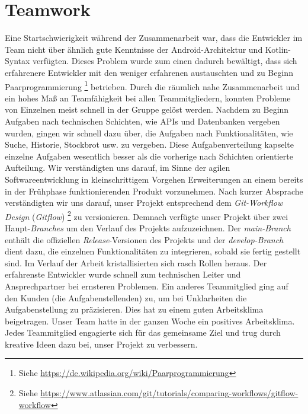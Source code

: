 \documentclass[a4paper]{article}
\begin{document}
\section{Teamwork}
\label{sec:teamwork}
Eine Startschwierigkeit während der Zusammenarbeit war, dass die Entwickler im Team nicht über ähnlich gute Kenntnisse der Android-Architektur und Kotlin-Syntax verfügten.
Dieses Problem wurde zum einen dadurch bewältigt, dass sich erfahrenere Entwickler mit den weniger erfahrenen austauschten und zu Beginn Paarprogrammierung \footnote{Siehe \url{https://de.wikipedia.org/wiki/Paarprogrammierung}} betrieben.
Durch die räumlich nahe Zusammenarbeit und ein hohes Maß an Teamfähigkeit bei allen Teammitgliedern, konnten Probleme von Einzelnen meist schnell in der Gruppe gelöst werden.
Nachdem zu Beginn Aufgaben nach technischen Schichten, wie APIs und Datenbanken vergeben wurden, gingen wir schnell dazu über, die Aufgaben nach Funktionalitäten, wie Suche, Historie, Stockbrot usw. zu vergeben.
Diese Aufgabenverteilung kapselte einzelne Aufgaben wesentlich besser als die vorherige nach Schichten orientierte Aufteilung.
Wir verständigten uns darauf, im Sinne der agilen Softwareentwicklung in kleinschrittigem Vorgehen Erweiterungen an einem bereits in der Frühphase funktionierenden Produkt vorzunehmen.
Nach kurzer Absprache verständigten wir uns darauf, unser Projekt entsprechend dem \textit{Git-Workflow Design} (\textit{Gitflow}) \footnote{Siehe \url{https://www.atlassian.com/git/tutorials/comparing-workflows/gitflow-workflow}} zu versionieren.
Demnach verfügte unser Projekt über zwei Haupt-\textit{Branches} um den Verlauf des Projekts aufzuzeichnen.
Der \textit{main-Branch} enthält die offiziellen \textit{Release}-Versionen des Projekts und der \textit{develop-Branch} dient dazu, die einzelnen Funktionalitäten zu integrieren, sobald sie fertig gestellt sind. \newline
Im Verlauf der Arbeit kristallisierten sich rasch Rollen heraus.
Der erfahrenste Entwickler wurde schnell zum technischen Leiter und Ansprechpartner bei ernsteren Problemen.
Ein anderes Teammitglied ging auf den Kunden (die Aufgabenstellenden) zu, um bei Unklarheiten die Aufgabenstellung zu präzisieren.
Dies hat zu einem guten Arbeitsklima beigetragen. \newline
Unser Team hatte in der ganzen Woche ein positives Arbeitsklima.
Jedes Teammitglied engagierte sich für das gemeinsame Ziel und trug durch kreative Ideen dazu bei, unser Projekt zu verbessern.
\end{document}
